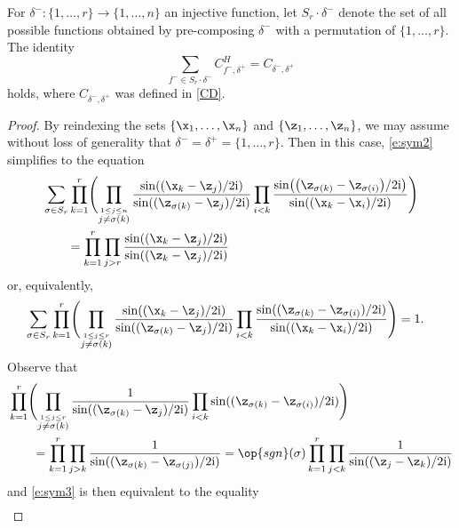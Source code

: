 \begin{Corollary} For $\delta^-\colon \{1, \dots, r\} \to \{1, \dots, n\}$ an injective function, let $S_r \cdot \delta^-$ denote the set of all possible functions obtained by pre-composing $\delta^-$ with a permutation of $\{1, \dots, r\}.$
The identity
\begin{equation}\label{e:sym2}
\sum_{f^- \in S_r \cdot \delta^-} C^H_{f^-, \delta^+}=C_{\delta^-, \delta^+}
\end{equation}
holds, where $C_{\delta^-, \delta^+}$ was defined in \eqref{CD}.
\end{Corollary}

\begin{proof}
By reindexing the sets $\{\x_1, \dots, \x_n\}$ and $\{\z_1, \dots, \z_n\}$, we may assume without loss of generality that $\delta^- = \delta^+ = \{1, \dots, r\}$. Then in this case, \eqref{e:sym2} simplifies to the equation
\begin{align*}
&\sum_{\sigma \in S_r} \prod_{k=1}^r \Biggl(\prod_{\stackrel{1 \leq j \leq n}{j\neq {\sigma(k)}}}\frac{ \sin( ( \x_{k}- \z_j)/2 {\rm i}) }{\sin(( \z_{\sigma(k)}- \z_j)/2 {\rm i})} \prod_{i<k} \frac{\sin\bigl(\bigl(\z_{\sigma(k)} - \z_{\sigma(i)}\bigr)/2{\rm i}\bigr)}{ \sin((\x_{k} - \x_{i})/2{\rm i})}\Biggr) \nonumber\\
&\qquad{}= \prod_{k=1}^r \prod_{j > r}\frac{ \sin( ( \x_{k}- \z_j)/2 {\rm i}) }{\sin(( \z_{k}- \z_j )/2 {\rm i})}
\end{align*}
or, equivalently,
\begin{align}
&\sum_{\sigma \in S_r} \prod_{k=1}^r \Biggl(\prod_{\stackrel{1 \leq j \leq r}{j\neq {\sigma(k)}}}\frac{ \sin( ( \x_{k}- \z_j)/2 {\rm i}) }{\sin(( \z_{\sigma(k)}- \z_j)/2 {\rm i})} \prod_{i<k} \frac{\sin((\z_{\sigma(k)} - \z_{\sigma(i)})/2{\rm i})}{ \sin((\x_{k} - \x_{i})/2{\rm i})}\Biggr)
= 1 .
\label{e:sym3}
\end{align}
Observe that
\begin{align*}
& \prod_{k=1}^r\Biggl( \prod_{\stackrel{1 \leq j \leq r}{j\neq {\sigma(k)}}} \frac{ 1}{\sin(( \z_{\sigma(k)}- \z_j)/2 {\rm i})}
 \prod_{i<k} \sin((\z_{\sigma(k)} - \z_{\sigma(i)})/2{\rm i}) \Biggr)\\
&\qquad{} = \prod_{k=1}^r \prod_{j>k} \frac{ 1}{\sin(( \z_{\sigma(k)}- \z_{\sigma(j)})/2 {\rm i})}
 = \op{sgn}(\sigma) \prod_{k=1}^r \prod_{j<k} \frac{ 1}{\sin(( \z_{j}- \z_{k})/2 {\rm i})}
\end{align*}
and \eqref{e:sym3} is then equivalent to the equality
\begin{align}

\end{align}
\end{proof}
